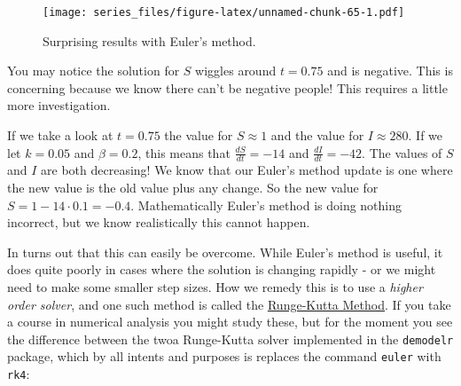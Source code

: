 \documentclass[
]{book}
\theoremstyle{definition}
\theoremstyle{definition}
\theoremstyle{definition}
\theoremstyle{remark}
\begin{document}
\begin{figure}
\centering
\texttt{[image: series\_files/figure-latex/unnamed-chunk-65-1.pdf]}
\caption{\label{fig:unnamed-chunk-65}Surprising results with Euler's method.}
\end{figure}

You may notice the solution for \(S\) wiggles around \(t=0.75\) and is negative. This is concerning because we know there can't be negative people! This requires a little more investigation.

If we take a look at \(t=0.75\) the value for \(S \approx 1\) and the value for \(I \approx 280\). If we let \(k=0.05\) and \(\beta=0.2\), this means that \(\displaystyle \frac{dS}{dt}=-14\) and \(\displaystyle \frac{dI}{dt}=-42\). The values of \(S\) and \(I\) are both decreasing! We know that our Euler's method update is one where the new value is the old value plus any change. So the new value for \(S = 1 -14\cdot 0.1 = -0.4\). Mathematically Euler's method is doing nothing incorrect, but we know realistically this cannot happen.

In turns out that this can easily be overcome. While Euler's method is useful, it does quite poorly in cases where the solution is changing rapidly - or we might need to make some smaller step sizes. How we remedy this is to use a \emph{higher order solver}, and one such method is called the \href{https://en.wikipedia.org/wiki/Runge\%E2\%80\%93Kutta_methods}{Runge-Kutta Method}. If you take a course in numerical analysis you might study these, but for the moment you see the difference between the twoa Runge-Kutta solver implemented in the \texttt{demodelr} package, which by all intents and purposes is replaces the command \texttt{euler} with \texttt{rk4}:
\end{document}
